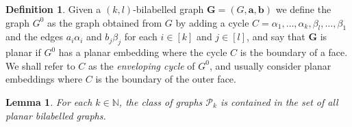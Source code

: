 \documentclass[11pt,a4paper]{article}
\theoremstyle{plain}
\newtheorem{lem}[thm]{Lemma}
\theoremstyle{remark}
\theoremstyle{definition}
\newtheorem{definition}[thm]{Definition}
\def\calP{{\mathcal P}} \def\calQ{{\mathcal Q}} \def\calR{{\mathcal R}}
\begin{document}
\begin{definition}
    Given a $(k,l)$-bilabelled graph $\boldsymbol{G} = (G, \boldsymbol{a}, \boldsymbol{b})$ we define the graph $G^0$ as the graph obtained from $G$ 
    by adding a cycle $C = \alpha_1, \dots, \alpha_k, \beta_l, \dots , \beta_1$ 
    and the edges $a_i\alpha_i$ and $b_j\beta_j$ for each $i \in [k]$ and $j \in [l]$, and say that $\boldsymbol{G}$ is planar if $G^{0}$ has a planar embedding where the cycle $C$ is the boundary of a face. We shall refer to $C$ as the \emph{enveloping cycle} of $G^0$, and usually consider planar embeddings where $C$ is the boundary of the outer face.\end{definition}

\begin{lem}\label{lem:planar-class}
    For each $k \in \mathbb{N}$, the class of graphs $\calP_k$ is contained in the set of all planar bilabelled graphs. \end{lem}
\end{document}
